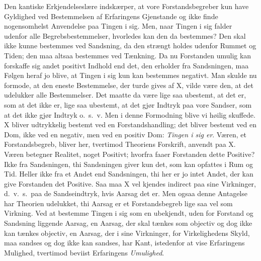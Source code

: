 \documentclass[12pt]{article}
\newcommand{\opage}[1]{\marginnote{\footnotesize\textit{[#1]}}}
\begin{document}
Den kantiske Erkjendelseslære indskærper, at vore
Forstandsbegreber kun have Gyldighed ved Bestemmelsen af
Erfaringens Gjenstande og ikke finde nogensomhelst Anvendelse
paa Tingen i sig. Men, naar Tingen i sig falder udenfor alle
Begrebsbestemmelser, hvorledes kan den da bestemmes? Den
skal ikke kunne bestemmes ved Sandsning, da den strængt
holdes udenfor Rummet og Tiden; den maa altsaa bestemmes
ved Tænkning. Da nu Forstanden umulig kan forskaffe sig
andet positivt Indhold end det, den erholder fra Sandsningen,
maa Følgen heraf jo blive, at Tingen i sig kun kan bestemmes
negativt. Man skulde nu formode, at den eneste Bestemmelse,
der turde gives af X, vilde være den, at det udelukker alle
Bestemmelser. Det maatte da være lige saa ubestemt, at det
er, som at det ikke er, lige saa ubestemt, at det gjør Indtryk
paa vore Sandser, som at det ikke gjør Indtryk o.\ s.\ v. Men i
denne Formodning blive vi høilig skuffede. X bliver udtryk\-kelig
bestemt ved en Forstandshandling; det bliver bestemt ved
en Dom, ikke ved en negativ, men ved en positiv Dom:
\emph{Tingen i sig er}. Væren, et Forstandsbegreb, bliver her,
\opage{13} tvertimod Theoriens Forskrift, anvendt paa X. Væren betegner
Realitet, noget Positivt; hvorfra faaer Forstanden dette Positive?
Ikke fra Sandsningen, thi Sandsningen giver kun det, som kan
opfattes i Rum og Tid. Heller ikke fra et Andet end
Sandsningen, thi her er jo intet Andet, der kan give Forstanden det
Positive. Saa maa X vel kjendes indirect paa sine Virkninger,
d.\ v.\ s.\ paa de Sandseindtryk, hvis Aarsag det er. Men ogsaa
denne Antagelse har Theorien udelukket, thi Aarsag er et
Forstandsbegreb lige saa vel som Virkning. Ved at bestemme
Tingen i sig som en ubekjendt, uden for Forstand og Sandsning
liggende Aarsag, en Aarsag, der skal tænkes som objectiv og
dog ikke kan tænkes objectiv, en Aarsag, der i sine Virkninger,
for Virkelighedens Skyld, maa sandses og dog ikke kan sandses,
har Kant, istedenfor at vise Erfaringens Mulighed, tvertimod
beviist Erfaringens \emph{Umulighed}.
\end{document}
